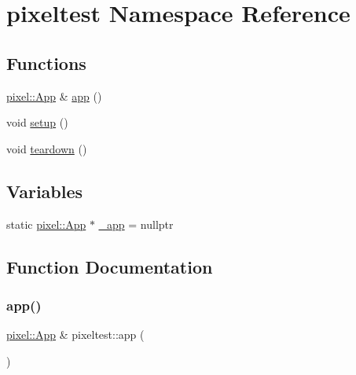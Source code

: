 \hypertarget{namespacepixeltest}{}\section{pixeltest Namespace Reference}
\label{namespacepixeltest}
\subsection*{Functions}
\begin{DoxyCompactItemize}
\item 
\hyperlink{classpixel_1_1_app}{pixel\+::\+App} \& \hyperlink{namespacepixeltest_aa77e41da0fefe92099aa392ba6252883}{app} ()
\item 
void \hyperlink{namespacepixeltest_ae242b7d9a1c2a9a2036d9ae244452eb2}{setup} ()
\item 
void \hyperlink{namespacepixeltest_ace98b9eea3017f56f7a554bf3eb5149f}{teardown} ()
\end{DoxyCompactItemize}
\subsection*{Variables}
\begin{DoxyCompactItemize}
\item 
static \hyperlink{classpixel_1_1_app}{pixel\+::\+App} $\ast$ \hyperlink{namespacepixeltest_a32fe0d2ad3f2c649b959003419ef989a}{\+\_\+app} = nullptr
\end{DoxyCompactItemize}


\subsection{Function Documentation}
\mbox{\label{namespacepixeltest_aa77e41da0fefe92099aa392ba6252883}} 
\subsubsection{\texorpdfstring{app()}{app()}}
{\footnotesize\ttfamily \hyperlink{classpixel_1_1_app}{pixel\+::\+App} \& pixeltest\+::app (\begin{DoxyParamCaption}{ }\end{DoxyParamCaption})}

\mbox{\label{namespacepixeltest_ae242b7d9a1c2a9a2036d9ae244452eb2}} 
